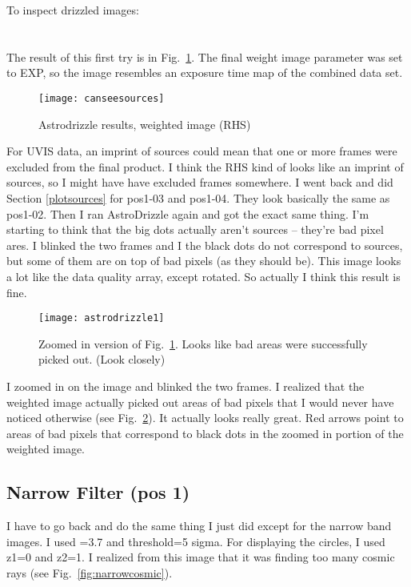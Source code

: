 \documentclass[11pt,obeyspaces]{article} %
\begin{document}
To inspect drizzled images:\\ 
 \\
 \\
The result of this first try is in Fig.~\ref{fig:firsttry}. The final weight image parameter was set to EXP, so the image resembles an exposure time map of the combined data set. 

\begin{figure}
\centering
\texttt{[image: canseesources]}
\caption{Astrodrizzle results, weighted image (RHS)}
\label{fig:firsttry}
\end{figure}


For UVIS data, an imprint of sources could mean that one or more frames were excluded from the final product. I think the RHS kind of looks like an imprint of sources, so I might have have excluded frames somewhere. I went back and did Section \ref{plotsources} for pos1-03 and pos1-04. They look basically the same as pos1-02. Then I ran AstroDrizzle again and got the exact same thing. I'm starting to think that the big dots actually aren't sources -- they're bad pixel ares. I blinked the two frames and I the black dots do not correspond to sources, but some of them are on top of bad pixels (as they should be). This image looks a lot like the data quality array, except rotated. So actually I think this result is fine. 


\begin{figure}
\centering
\texttt{[image: astrodrizzle1]}
\caption{Zoomed in version of Fig.~\ref{fig:firsttry}. Looks like bad areas were successfully picked out. (Look closely)}
\label{fig:badpixels}
\end{figure}

I zoomed in on the image and blinked the two frames. I realized that the weighted image actually picked out areas of bad pixels that I would never have noticed otherwise (see Fig.~\ref{fig:badpixels}). It actually looks really great. Red arrows point to areas of bad pixels that correspond to black dots in the zoomed in portion of the weighted image. 


\subsection{Narrow Filter (pos 1)}

I have to go back and do the same thing I just did except for the narrow band images. I used =3.7 and threshold=5 sigma. For displaying the circles, I used z1=0 and z2=1. I realized from this image that it was finding too many cosmic rays (see Fig.~\ref{fig:narrowcosmic}). 
\end{document}
